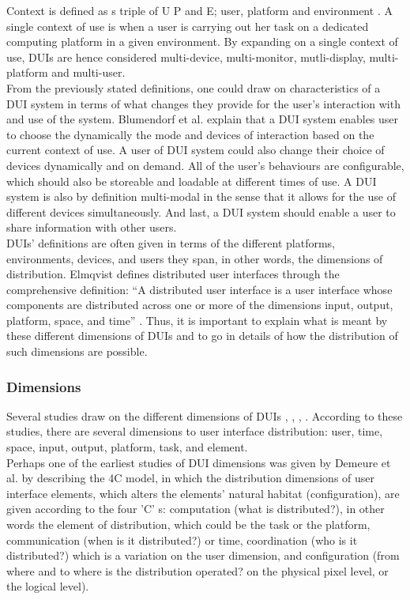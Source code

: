 Context is defined as s triple of U P and E; user, platform and
environment \cite{vanderdonckt2010distributed}. A single context of
use is when a user is carrying out her task on a dedicated computing platform in
a given environment. By expanding on a single context of use, DUIs are hence
considered  multi-device, multi-monitor, mutli-display,
multi-platform and multi-user. \cite{vanderdonckt2010distributed}\\

From the previously stated definitions, one could draw on characteristics of a
DUI system in terms of what changes they provide for the user's interaction with
and use of the system. Blumendorf et al. \cite{blumendorf2011distributed}
explain that a DUI system enables user to choose the dynamically the mode and devices of interaction based
on the current context of use. A user of DUI system could also change their
choice of devices dynamically and on demand. All of the user's behaviours are
configurable, which should also be storeable and loadable at different times of
use. A DUI system is also by definition multi-modal in the sense that it allows
for the use of different devices simultaneously. And last, a DUI system
should enable a user to share information with other users.\\ 

DUIs' definitions are often given in terms of the different platforms,
environments, devices, and users they span, in other words, the dimensions of
distribution. Elmqvist defines distributed user interfaces through the
comprehensive definition: ``A distributed user interface is a user interface whose components are distributed across one
or more of the dimensions input, output, platform, space, and time''
\cite{elmqvist2011distributed}. Thus, it is important to explain what is meant
by these different dimensions of DUIs and to go in details of how the
distribution of such dimensions are possible.

\subsubsection{Dimensions}
Several studies draw on the different dimensions of DUIs
\cite{melchior2011distributed}, \cite{demeure20084c},
\cite{elmqvist2011distributed}, \cite{vanderdonckt2010distributed}. According to
these studies, there are several dimensions to user interface distribution:
user, time, space, input, output, platform, task, and element.\\ 
Perhaps one of the earliest studies of DUI dimensions was
given by Demeure et al. by describing the 4C model, in
which the distribution dimensions of user interface elements, which alters the
elements' natural habitat (configuration), are given according to the four 'C'
s: computation (what is distributed?), in other words the element of
distribution, which could be the task or the platform, communication (when is it distributed?)
or time, coordination (who is it distributed?) which is a variation on the user
dimension, and configuration (from where and to where is the distribution operated? on the physical pixel level, or
the logical level)\cite{demeure20084c}.\\

